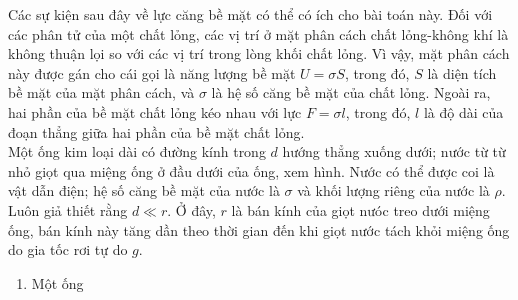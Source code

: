 \begin{vd}
Các sự kiện sau đây về lực căng bề mặt có thể có ích cho bài toán này. Đối với các phân tử của một chất lỏng, các vị trí ở mặt phân cách chất lỏng-không khí là không thuận lọi so với các vị trí trong lòng khối chất lỏng. Vì vậy, mặt phân cách này được gán cho cái gọi là năng lượng bề mặt $U=\sigma S$, trong đó, $S$ là diện tích bề mặt của mặt phân cách, và $\sigma$ là hệ số căng bề mặt của chất lỏng. Ngoài ra, hai phần của bề mặt chất lỏng kéo nhau với lực $F=\sigma l$, trong đó, $l$ là độ dài của đoạn thẳng giữa hai phần của bề mặt chất lỏng.\\
Một ống kim loại dài có đường kính trong $d$ hướng thẳng xuống dưới; nước từ từ nhỏ giọt qua miệng ống ở đầu dưới của ống, xem hình. Nước có thể được coi là vật dẫn điện; hệ số căng bề mặt của nước là $\sigma$ và khối lượng riêng của nước là $\rho$. Luôn giả thiết rằng $d \ll r.$ Ở đây, $r$ là bán kính của giọt nưóc treo dưới miệng ống, bán kính này tăng dần theo thời gian đến khi giọt nước tách khỏi miệng ống do gia tốc rơi tự do $g$.
\begin{enumerate}[\bf Phần A.]
    \item Một ống
    \begin{center}
        


\begin{tikzpicture}[x=0.75pt,y=0.75pt,yscale=-1,xscale=1]


\end{tikzpicture}
\end{center}
\end{enumerate}
\end{vd}
